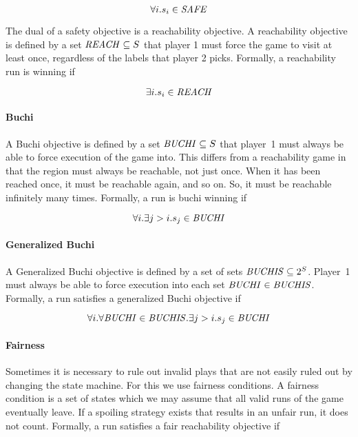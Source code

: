 \begin{equation}
\label{eqn:safeobj}
\forall i. s_i \in \mathit{SAFE}
\end{equation}

The dual of a safety objective is a reachability objective. A reachability objective is defined by a set $\mathit{REACH} \subseteq S$ that player 1 must force the game to visit at least once, regardless of the labels that player 2 picks. Formally, a reachability run is winning if 

\begin{equation}
\label{eqn:reachobj}
\exists i. s_i \in \mathit{REACH}
\end{equation}

\paragraph{Buchi}
A Buchi objective is defined by a set $\mathit{BUCHI} \subseteq S$ that player~1 must always be able to force execution of the game into. This differs from a reachability game in that the region must always be reachable, not just once. When it has been reached once, it must be reachable again, and so on. So, it must be reachable infinitely many times. Formally, a run is buchi winning if 

\begin{equation}
\forall i. \exists j>i. s_j \in \mathit{BUCHI}
\end{equation}

\paragraph{Generalized Buchi}
A Generalized Buchi objective is defined by a set of sets $\mathit{BUCHIS} \subseteq 2^S$. Player~1 must always be able to force execution into each set $\mathit{BUCHI} \in \mathit{BUCHIS}$. Formally, a run satisfies a generalized Buchi objective if 

\begin{equation}
\forall i. \forall \mathit{BUCHI} \in \mathit{BUCHIS}. \exists j>i. s_j \in \mathit{BUCHI}
\end{equation}

\paragraph{Fairness}
Sometimes it is necessary to rule out invalid plays that are not easily ruled out by changing the state machine. For this we use fairness conditions. A fairness condition is a set of states which we may assume that all valid runs of the game eventually leave. If a spoiling strategy exists that results in an unfair run, it does not count. Formally, a run satisfies a fair reachability objective if 

